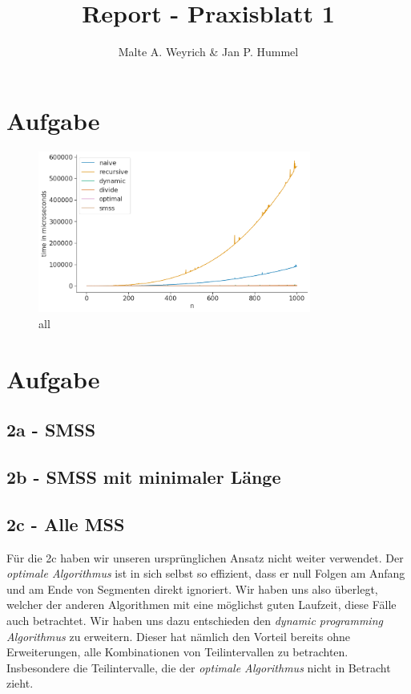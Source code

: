 \documentclass[10pt]{article}
\title{Report - Praxisblatt 1}
\author{Malte A. Weyrich & Jan P. Hummel}
\begin{document}
\maketitle
\section{Aufgabe}
\lipsum[1]
\begin{figure}[h]
    \centering
    \includegraphics[width=0.8\textwidth]{../times_1000_all.png}
    \caption{all}
    \label{fig:Test}
\end{figure}

\section{Aufgabe}

\lipsum[1]
\subsection{2a - SMSS}\label{2a}
\lipsum[1]
\subsection{2b - SMSS mit minimaler Länge}\label{2b}
\lipsum[1]
\subsection{2c - Alle MSS} 

Für die 2c haben wir unseren ursprünglichen Ansatz nicht weiter verwendet. Der \textit{optimale Algorithmus} ist in sich selbst so effizient,
dass er null Folgen am Anfang und am Ende von Segmenten direkt ignoriert. Wir haben uns also überlegt, welcher der anderen 
Algorithmen mit eine möglichst guten Laufzeit, diese Fälle auch betrachtet. Wir haben uns dazu entschieden den \textit{dynamic programming Algorithmus} zu erweitern. Dieser hat nämlich den Vorteil
bereits ohne Erweiterungen, alle Kombinationen von Teilintervallen zu betrachten. Insbesondere die Teilintervalle,
die der \textit{optimale Algorithmus} nicht in Betracht zieht.
\end{document}

